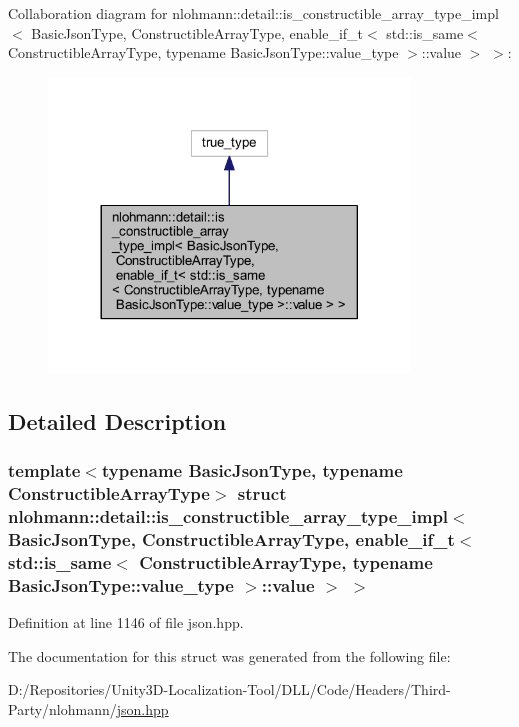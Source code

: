 Collaboration diagram for nlohmann\+::detail\+::is\+\_\+constructible\+\_\+array\+\_\+type\+\_\+impl$<$ Basic\+Json\+Type, Constructible\+Array\+Type, enable\+\_\+if\+\_\+t$<$ std\+::is\+\_\+same$<$ Constructible\+Array\+Type, typename Basic\+Json\+Type\+::value\+\_\+type $>$\+::value $>$ $>$\+:
\nopagebreak
\begin{figure}[H]
\begin{center}
\leavevmode
\includegraphics[width=272pt]{structnlohmann_1_1detail_1_1is__constructible__array__type__impl_3_01_basic_json_type_00_01_cons813a7e0ad7967e43a908c1c061f07bc3}
\end{center}
\end{figure}


\subsection{Detailed Description}
\subsubsection*{template$<$typename Basic\+Json\+Type, typename Constructible\+Array\+Type$>$\newline
struct nlohmann\+::detail\+::is\+\_\+constructible\+\_\+array\+\_\+type\+\_\+impl$<$ Basic\+Json\+Type, Constructible\+Array\+Type, enable\+\_\+if\+\_\+t$<$ std\+::is\+\_\+same$<$ Constructible\+Array\+Type, typename Basic\+Json\+Type\+::value\+\_\+type $>$\+::value $>$ $>$}



Definition at line 1146 of file json.\+hpp.



The documentation for this struct was generated from the following file\+:\begin{DoxyCompactItemize}
\item 
D\+:/\+Repositories/\+Unity3\+D-\/\+Localization-\/\+Tool/\+D\+L\+L/\+Code/\+Headers/\+Third-\/\+Party/nlohmann/\mbox{\hyperlink{json_8hpp}{json.\+hpp}}\end{DoxyCompactItemize}
